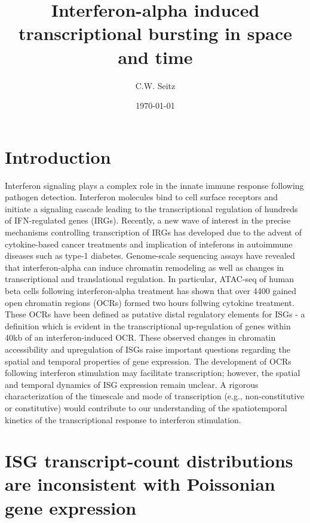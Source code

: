 \documentclass{article}
\title{Interferon-alpha induced transcriptional bursting in space and time}
\author{C.W. Seitz}
\date{\today}
\begin{document}
\maketitle

\section{Introduction}

Interferon signaling plays a complex role in the innate immune response following pathogen detection. Interferon molecules bind to cell surface receptors and initiate a signaling cascade leading to the transcriptional regulation of hundreds of IFN-regulated genes (IRGs). Recently, a new wave of interest in the precise mechanisms controlling transcription of IRGs has developed due to the advent of cytokine-based cancer treatments and implication of inteferons in autoimmune diseases such as type-1 diabetes. Genome-scale sequencing assays have revealed that interferon-alpha can induce chromatin remodeling as well as changes in transcriptional and translational regulation. In particular, ATAC-seq of human beta cells following interferon-alpha treatment has shown that over 4400 gained open chromatin regions (OCRs) formed two hours follwing cytokine treatment. These OCRs have been defined as putative distal regulatory elements for ISGs - a definition which is evident in the transcriptional up-regulation of genes within 40kb of an interferon-induced OCR. These observed changes in chromatin accessibility and upregulation of ISGs raise important questions regarding the spatial and temporal properties of gene expression. The development of OCRs following interferon stimulation may facilitate transcription; however, the spatial and temporal dynamics of ISG expression remain unclear. A rigorous characterization of the timescale and mode of transcription (e.g., non-constitutive or constitutive) would contribute to our understanding of the spatiotemporal kinetics of the transcriptional response to interferon stimulation.   

\section{ISG transcript-count distributions are inconsistent with Poissonian gene expression}
\end{document}
